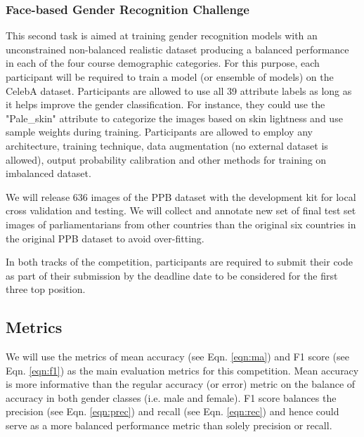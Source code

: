 \documentclass[11pt, oneside]{article}
\begin{document}
\subsubsection{Face-based Gender Recognition Challenge}
This second task is aimed at training gender recognition models with an 
unconstrained non-balanced realistic dataset producing a balanced performance 
in each of the four course demographic categories. For this purpose, each 
participant will be required to train a model (or ensemble of models) on the CelebA 
dataset. Participants are allowed to use all 39 attribute labels as long as 
it helps improve the gender classification. For instance, they could use the 
"Pale\_skin" attribute to categorize the images based on skin lightness and use 
sample weights during training. Participants are allowed to employ any 
architecture, training technique, data augmentation (no external dataset is 
allowed), output probability calibration and other methods for training on 
imbalanced dataset.

We will release 636 images of the PPB dataset with the development kit for 
local cross validation and testing. We will collect and annotate new set of 
final test set images of parliamentarians from other countries than the 
original six countries in the original PPB dataset to avoid over-fitting.

In both tracks of the competition, participants are required to submit their 
code as part of their submission by the deadline date to be considered for the 
first three top position.


\subsection{Metrics}
\label{sec:metrics}
We will use the metrics of mean accuracy (see Eqn. \ref{eqn:ma}) and F1 score (see 
Eqn. \ref{eqn:f1}) as the main evaluation metrics for this competition. Mean 
accuracy is more informative than the regular accuracy (or error) metric on the 
balance of accuracy in both gender classes (i.e. male and 
female). F1 score balances the precision (see Eqn. \ref{eqn:prec}) and recall 
(see Eqn. \ref{eqn:rec}) and hence could serve as a more balanced performance 
metric than solely precision or recall.
\end{document}
